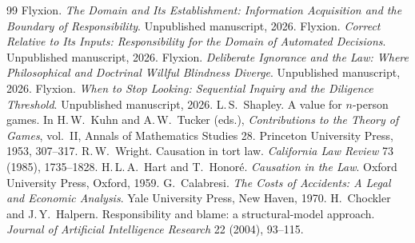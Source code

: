 \documentclass[11pt]{article}
\theoremstyle{plain}
\theoremstyle{definition}
\begin{document}
\begin{thebibliography}{99}
 Flyxion. \emph{The Domain and Its Establishment: Information Acquisition and the Boundary of Responsibility}. Unpublished manuscript, 2026.
 Flyxion. \emph{Correct Relative to Its Inputs: Responsibility for the Domain of Automated Decisions}. Unpublished manuscript, 2026.
 Flyxion. \emph{Deliberate Ignorance and the Law: Where Philosophical and Doctrinal Willful Blindness Diverge}. Unpublished manuscript, 2026.
 Flyxion. \emph{When to Stop Looking: Sequential Inquiry and the Diligence Threshold}. Unpublished manuscript, 2026.
 L.\,S.\ Shapley. A value for $n$-person games. In H.\,W.\ Kuhn and A.\,W.\ Tucker (eds.), \emph{Contributions to the Theory of Games}, vol.\ II, Annals of Mathematics Studies 28. Princeton University Press, 1953, 307--317.
 R.\,W.\ Wright. Causation in tort law. \emph{California Law Review} 73 (1985), 1735--1828.
 H.\,L.\,A.\ Hart and T.\ Honor\'e. \emph{Causation in the Law}. Oxford University Press, Oxford, 1959.
 G.\ Calabresi. \emph{The Costs of Accidents: A Legal and Economic Analysis}. Yale University Press, New Haven, 1970.
 H.\ Chockler and J.\,Y.\ Halpern. Responsibility and blame: a structural-model approach. \emph{Journal of Artificial Intelligence Research} 22 (2004), 93--115.
\end{thebibliography}
\end{document}
